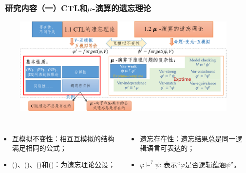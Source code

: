 \documentclass[aspectratio=1610, 9pt, CJK]{beamer}
\begin{document}
\begin{frame}  
	\frametitle{~研究内容（一）CTL和$\mu$-演算的遗忘理论}
	\begin{figure}
		\includegraphics[scale=0.45]{figures/ctlMuForgFrame2}
	\end{figure}
	{\tiny 
		\begin{columns}
			\begin{itemize} 
				\item 互模拟不变性：相互互模拟的结构满足相同的公式；
				\item (\W)、(\PP)、(\NgP)和(\IR)：为遗忘理论公设；
			\end{itemize}
			\begin{itemize}
				\item 遗忘存在性：遗忘结果总是同一逻辑语言可表达的；
				\item $\varphi \models^? \psi$: 表示“$\varphi$是否逻辑蕴涵$\psi$”。
			\end{itemize}
		\end{columns}
	} 
\end{frame}
\end{document}
